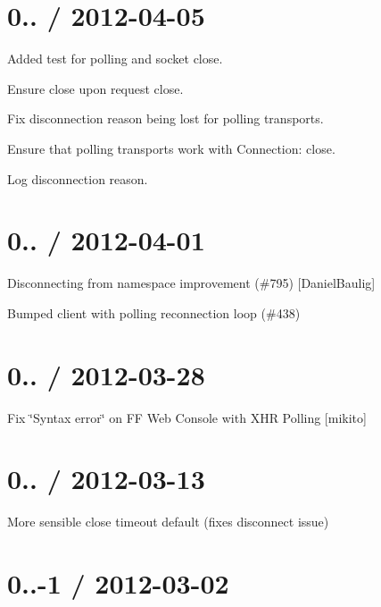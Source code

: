 \section*{0.. / 2012-\/04-\/05 }


\begin{DoxyItemize}
\item Added test for polling and socket close.
\item Ensure close upon request close.
\item Fix disconnection reason being lost for polling transports.
\item Ensure that polling transports work with Connection\+: close.
\item Log disconnection reason.
\end{DoxyItemize}

\section*{0.. / 2012-\/04-\/01 }


\begin{DoxyItemize}
\item Disconnecting from namespace improvement (\#795) \mbox{[}Daniel\+Baulig\mbox{]}
\item Bumped client with polling reconnection loop (\#438)
\end{DoxyItemize}

\section*{0.. / 2012-\/03-\/28 }


\begin{DoxyItemize}
\item Fix \char`\"{}\+Syntax error\char`\"{} on FF Web Console with X\+HR Polling \mbox{[}mikito\mbox{]}
\end{DoxyItemize}

\section*{0.. / 2012-\/03-\/13 }


\begin{DoxyItemize}
\item More sensible close {\ttfamily timeout default} (fixes disconnect issue)
\end{DoxyItemize}

\section*{0..-\/1 / 2012-\/03-\/02 }


